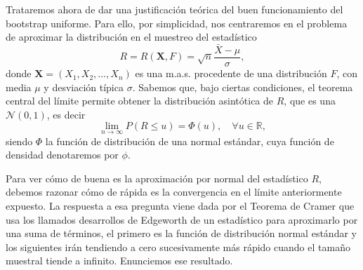 \documentclass[
]{book}
\theoremstyle{break}
\theoremstyle{definition}
\theoremstyle{definition}
\theoremstyle{definition}
\theoremstyle{remark}
\begin{document}
Trataremos ahora de dar una justificación teórica del buen
funcionamiento del bootstrap uniforme. Para ello, por simplicidad, nos
centraremos en el problema de aproximar la distribución en el muestreo
del estadístico
\[R=R\left( \mathbf{X},F \right) =\sqrt{n}\frac{\bar{X}-\mu }{\sigma },\]
donde \(\mathbf{X}=\left( X_1,X_2,\ldots ,X_n \right)\) es una
m.a.s. procedente de una distribución \(F\), con media \(\mu\) y desviación
típica \(\sigma\). Sabemos que, bajo ciertas condiciones, el teorema
central del límite permite obtener la distribución asintótica de \(R\),
que es una \(\mathcal{N}\left( 0,1 \right)\), es decir
\[\lim_{n\rightarrow \infty }P\left( R\leq u \right) =\Phi \left( u \right),
\quad\forall u\in \mathbb{R},\]
siendo \(\Phi\) la función de distribución de una normal estándar, cuya
función de densidad denotaremos por \(\phi\).

Para ver cómo de buena es la aproximación por normal del estadístico
\(R\), debemos razonar cómo de rápida es la convergencia en el límite
anteriormente expuesto. La respuesta a esa pregunta viene dada por el
Teorema de Cramer que usa los llamados desarrollos de Edgeworth de un
estadístico para aproximarlo por una suma de términos, el primero es la
función de distribución normal estándar y los siguientes irán tendiendo
a cero sucesivamente más rápido cuando el tamaño muestral tiende a
infinito. Enunciemos ese resultado.
\end{document}
